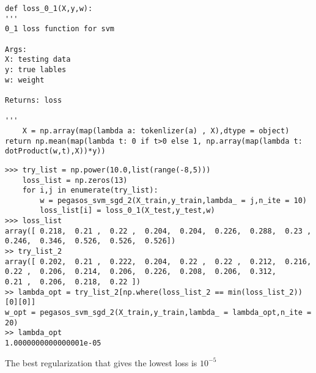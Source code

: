 \documentclass{article}
\newenvironment{problem}[2][$\bullet$]{\begin{trivlist}\large
		\item[\hskip \labelsep {\bfseries #1}\hskip \labelsep {\bfseries #2.}]}  {\end{trivlist}}
\begin{document}
\begin{problem}{3.5}
	\end{problem}
\begin{verbatim}
def loss_0_1(X,y,w):
'''
0_1 loss function for svm

Args:
X: testing data
y: true lables
w: weight

Returns: loss

'''
	X = np.array(map(lambda a: tokenlizer(a) , X),dtype = object)
return np.mean(map(lambda t: 0 if t>0 else 1, np.array(map(lambda t: dotProduct(w,t),X))*y))

\end{verbatim}

\begin{problem}{3.6}
\end{problem}

\begin{verbatim}
>>> try_list = np.power(10.0,list(range(-8,5)))
    loss_list = np.zeros(13)
    for i,j in enumerate(try_list):
	    w = pegasos_svm_sgd_2(X_train,y_train,lambda_ = j,n_ite = 10)
	    loss_list[i] = loss_0_1(X_test,y_test,w)
>>> loss_list
array([ 0.218,  0.21 ,  0.22 ,  0.204,  0.204,  0.226,  0.288,  0.23 ,
0.246,  0.346,  0.526,  0.526,  0.526])
>> try_list_2
array([ 0.202,  0.21 ,  0.222,  0.204,  0.22 ,  0.22 ,  0.212,  0.216,
0.22 ,  0.206,  0.214,  0.206,  0.226,  0.208,  0.206,  0.312,
0.21 ,  0.206,  0.218,  0.22 ])
>> lambda_opt = try_list_2[np.where(loss_list_2 == min(loss_list_2))[0][0]]
w_opt = pegasos_svm_sgd_2(X_train,y_train,lambda_ = lambda_opt,n_ite = 20)
>> lambda_opt
1.0000000000000001e-05
\end{verbatim}

The best regularization that gives the lowest loss is $10^{-5}$
\end{document}
